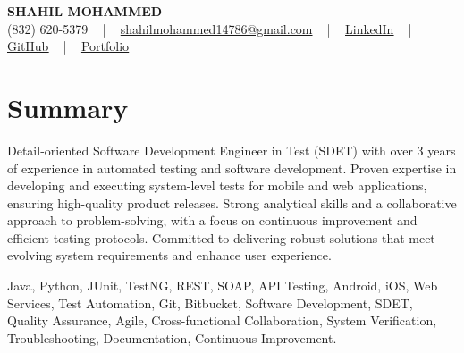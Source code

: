 \documentclass[letterpaper,10pt]{article}
\begin{document}
\begin{center}
    {\fontsize{14pt}{12pt}\selectfont \textbf{\MakeUppercase{Shahil Mohammed}}}\\ \vspace{2pt}
    \fontsize{10pt}{12pt}\selectfont (832) 620-5379 ~ | ~ \href{mailto:shahilmohammed14786@gmail.com}{shahilmohammed14786@gmail.com} ~ | ~  
    \href{https://www.linkedin.com/in/shahil-mohammed-9652931a1/}{\color{blue}\underline{LinkedIn}}  ~ | ~ 
    \href{https://github.com/freakbeast14}{\color{blue}\underline{GitHub}} ~ | ~ 
    \href{https://shahil-mohammed.netlify.app/}{\color{blue}\underline{Portfolio}}
    \vspace{-8pt}
\end{center}

\section{Summary}
\vspace{-2pt}\fontsize{8pt}{9pt}\selectfont
Detail-oriented Software Development Engineer in Test (SDET) with over 3 years of experience in automated testing and software development. Proven expertise in developing and executing system-level tests for mobile and web applications, ensuring high-quality product releases. Strong analytical skills and a collaborative approach to problem-solving, with a focus on continuous improvement and efficient testing protocols. Committed to delivering robust solutions that meet evolving system requirements and enhance user experience.
 \vspace{-5pt}
 
{\fontsize{1pt}{1pt}\selectfont\color{white}
Java, Python, JUnit, TestNG, REST, SOAP, API Testing, Android, iOS, Web Services, Test Automation, Git, Bitbucket, Software Development, SDET, Quality Assurance, Agile, Cross-functional Collaboration, System Verification, Troubleshooting, Documentation, Continuous Improvement.
}
\vspace{-8pt}

\vspace{-2pt}
\end{document}
